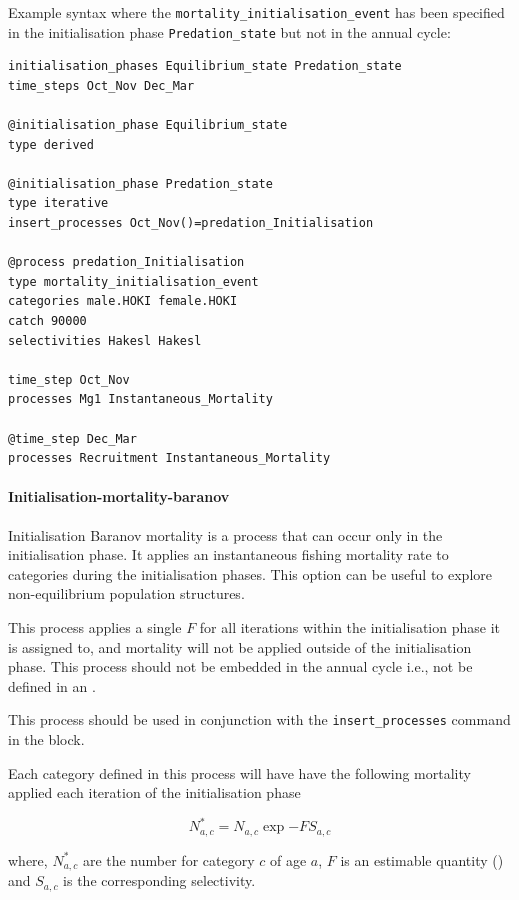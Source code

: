Example syntax where the \texttt{mortality\_initialisation\_event} has been specified in the initialisation phase \texttt{Predation\_state} but not in the annual cycle:

{\small{\begin{verbatim}
initialisation_phases Equilibrium_state Predation_state
time_steps Oct_Nov Dec_Mar

@initialisation_phase Equilibrium_state
type derived

@initialisation_phase Predation_state
type iterative
insert_processes Oct_Nov()=predation_Initialisation

@process predation_Initialisation
type mortality_initialisation_event
categories male.HOKI female.HOKI
catch 90000
selectivities Hakesl Hakesl

time_step Oct_Nov
processes Mg1 Instantaneous_Mortality

@time_step Dec_Mar
processes Recruitment Instantaneous_Mortality
\end{verbatim}}}

\paragraph{Initialisation-mortality-baranov}\label{sec:Process-MortalityInitialisationBaranov}

Initialisation Baranov mortality  is a process that can occur only in the initialisation phase. It applies an instantaneous fishing mortality rate to categories during the initialisation phases. This option can be useful to explore non-equilibrium population structures.

This process applies a single \(F\) for all iterations within the initialisation phase it is assigned to, and mortality will not be applied outside of the initialisation phase. This process should not be embedded in the annual cycle i.e., not be defined in an .

This process should be used in conjunction with the \texttt{insert\_processes} command in the  block.

Each category defined in this process will have have the following mortality applied each iteration of the initialisation phase

\[
N^*_{a,c}  = N_{a,c} \exp{-F S_{a,c}}
\]

where, \(N^*_{a,c}\) are the number for category \(c\) of age \(a\), \(F\) is an estimable quantity () and \(S_{a,c}\) is the corresponding selectivity.

